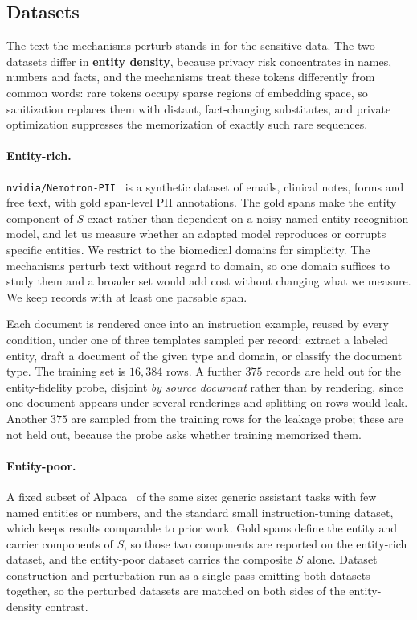 \subsection{Datasets}
The text the mechanisms perturb stands in for the sensitive data.
The two datasets differ in \textbf{entity density},
because privacy risk concentrates in names,
numbers and facts,
and the mechanisms treat these tokens differently from common words:
rare tokens occupy sparse regions of embedding space,
so sanitization replaces them with distant,
fact-changing substitutes,
and private optimization suppresses the memorization of exactly such rare sequences.

\paragraph{Entity-rich.}
\texttt{nvidia/Nemotron-PII}~\citep{nvidia2025nemotronpii} is a synthetic dataset of emails,
clinical notes,
forms and free text,
with gold span-level PII annotations.
The gold spans make the entity component of $S$ exact rather than dependent on a noisy named entity recognition model,
and let us measure whether an adapted model reproduces or corrupts specific entities.
We restrict to the biomedical domains for simplicity.
The mechanisms perturb text without regard to domain,
so one domain suffices to study them and a broader set would add cost without changing what we measure.
We keep records with at least one parsable span.

Each document is rendered once into an instruction example,
reused by every condition,
under one of three templates sampled per record:
extract a labeled entity,
draft a document of the given type and domain,
or classify the document type.
The training set is $16{,}384$ rows.
A further $375$ records are held out for the entity-fidelity probe,
disjoint \textit{by source document} rather than by rendering,
since one document appears under several renderings and splitting on rows would leak.
Another $375$ are sampled from the training rows for the leakage probe;
these are not held out,
because the probe asks whether training memorized them.

\paragraph{Entity-poor.}
A fixed subset of Alpaca~\citep{taori2023alpaca} of the same size:
generic assistant tasks with few named entities or numbers,
and the standard small instruction-tuning dataset,
which keeps results comparable to prior work.
Gold spans define the entity and carrier components of $S$,
so those two components are reported on the entity-rich dataset,
and the entity-poor dataset carries the composite $S$ alone.
Dataset construction and perturbation run as a single pass emitting both datasets together,
so the perturbed datasets are matched on both sides of the entity-density contrast.

